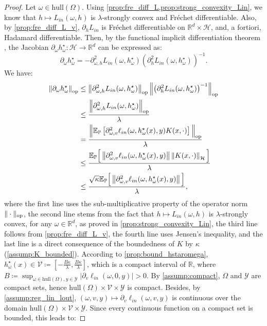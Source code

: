 \begin{proof}
Let $\omega\in \text{hull}(\Omega)$. Using \cref{prop:fre_diff_L,prop:strong_convexity_Lin}, we know that $h\mapsto L_{in}(\omega,h)$ is $\lambda$-strongly convex and Fr\'echet differentiable. Also, by \cref{prop:fre_diff_L_v}, $\partial_h L_{in}$ is Fr\'echet differentiable on $\mathbb{R}^d\times\mathcal{H}$, and, a fortiori, Hadamard differentiable. Then, by the functional implicit differentiation theorem \citep[Theorem~2.1]{petrulionyte2024functional}, the Jacobian $\partial_\omega h^\star_\omega:\mathcal{H}\to\mathbb{R}^d$ can be expressed as:
\begin{equation*}
    \partial_\omega h^\star_\omega=-\partial_{\omega, h}^2 L_{in}(\omega, h^\star_\omega)\left(\partial_h^2 L_{in}(\omega, h^\star_\omega)\right)^{-1}.
\end{equation*}
We have:
\begin{align}
    \left\|\partial_\omega h^\star_\omega\right\|_{\operatorname{op}}&\leq\left\|\partial_{\omega, h}^2 L_{in}(\omega, h^\star_\omega)\right\|_{\operatorname{op}}\left\|\left(\partial_h^2 L_{in}(\omega, h^\star_\omega)\right)^{-1}\right\|_{\operatorname{op}}\nonumber\\
    &\leq\frac{\left\|\partial_{\omega, h}^2 L_{in}(\omega, h^\star_\omega)\right\|_{\operatorname{op}}}{\lambda}\nonumber\\
    &=\frac{\Big\|\mathbb{E}_\mathbb{P}\left[\partial_{\omega, v}^2 \ell_{in}(\omega, h^\star_\omega(x), y)K(x,\cdot)\right]\Big\|_{\operatorname{op}}}{\lambda}\nonumber\\
    &\leq\frac{\mathbb{E}_\mathbb{P}\Big[\left\|\partial_{\omega, v}^2 \ell_{in}(\omega, h^\star_\omega(x), y)\right\|\left\|K(x,\cdot)\right\|_\mathcal{H}\Big]}{\lambda}\nonumber\\
    &\leq\frac{\sqrt{\kappa}\mathbb{E}_\mathbb{P}\Big[\left\|\partial_{\omega, v}^2 \ell_{in}(\omega, h^\star_\omega(x), y)\right\|\Big]}{\lambda},\label{eq:upp_bound_jac}
\end{align}
where the first line uses the sub-multiplicative property of the operator norm $\|\cdot\|_{\operatorname{op}}$, the second line stems from the fact that $h\mapsto L_{in}(\omega, h)$ is $\lambda$-strongly convex, for any $\omega\in\mathbb{R}^d$, as proved in \cref{prop:strong_convexity_Lin}, the third line follows from \cref{prop:fre_diff_L_v}, the fourth line uses Jensen's inequality, and the last line is a direct consequence of the boundedness of $K$ by $\kappa$ (\cref{assump:K_bounded}). According to \cref{prop:bound_hstaromega}, $h^\star_\omega(x)\in\mathcal{V}\coloneqq\left[-\frac{B\kappa}{\lambda},\frac{B\kappa}{\lambda}\right]$, which is a compact interval of $\mathbb{R}$, where $B\coloneqq\sup_{\omega\in\text{hull}(\Omega),y\in\mathcal{Y}}\left|\partial_v \ell_{in}(\omega, 0, y)\right|>0$. By \cref{assump:compact}, $\Omega$ and $\mathcal{Y}$ are compact sets, hence $\text{hull}(\Omega)\times\mathcal{V}\times\mathcal{Y}$ is compact. Besides, by \cref{assump:reg_lin_lout}, $(\omega, v, y)\mapsto\partial_v\ell_{in}(\omega, v, y)$ is continuous over the domain $\text{hull}(\Omega)\times\mathcal{V}\times\mathcal{Y}$. Since every continuous function on a compact set is bounded, this leads to:

\end{proof}
